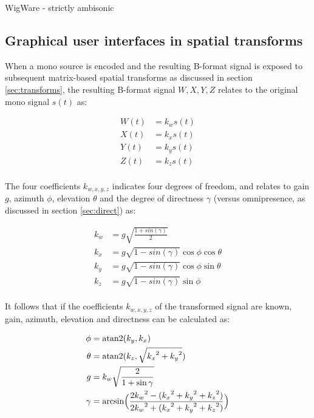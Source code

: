 \documentclass{article}
\begin{document}
WigWare - strictly ambisonic

\subsection{Graphical user interfaces in spatial transforms}\label{sec:gui}

When a mono source is encoded and the resulting B-format signal is exposed to subsequent matrix-based spatial transforms as discussed in section \ref{sec:transforms}, the resulting B-format signal $W, X, Y, Z$ relates to the original mono signal $s(t)$ as:

\begin{equation} \label{eq:encoded}
\begin{split}
W(t) & = k_w s(t) \\
X(t) & = k_x s(t) \\
Y(t) & = k_y s(t) \\
Z(t) & = k_z s(t) \\
\end{split}
\end{equation}

The four coefficients $k_{w, x, y, z}$ indicates four degrees of freedom, and relates to gain $g$, azimuth $\phi$, elevation $\theta$ and the degree of directness $\gamma$ (versus omnipresence, as discussed in section \ref{sec:direct}) as:

\begin{equation} \label{eq:encodedCoefficients}
\begin{split}
k_w & = g \sqrt{ \frac{1 + sin(\gamma)} {2} } \\
k_x & = g \sqrt{ 1 - sin(\gamma) } \cos{\phi} \cos{\theta} \\
k_y & = g \sqrt{ 1 - sin(\gamma) } \cos{\phi} \sin{\theta} \\
k_z & = g \sqrt{ 1 - sin(\gamma) } \sin{\phi}               \\
\end{split}
\end{equation}

It follows that if the coefficients $k_{w, x, y, z}$ of the transformed signal are known, gain, azimuth, elevation and directness can be calculated as:

\begin{equation} \label{eq:interpreteCoefficients}
\begin{split}
\phi   & = \textnormal{atan2}(k_y, k_x) \\
\theta & = \textnormal{atan2}(k_z, \sqrt{{k_x}^2 + {k_y}^2}) \\
g      & = k_w \sqrt{ \frac{2}{1 + \sin{\gamma} } }\\
\gamma & = \textnormal{arcsin} \Big( \frac{2 {k_w}^2 - ({k_x}^2 + {k_y}^2 +{k_z}^2)} {2 {k_w}^2 + ({k_x}^2 + {k_y}^2 +{k_z}^2 )} \Big)
\end{split}
\end{equation}
\end{document}

